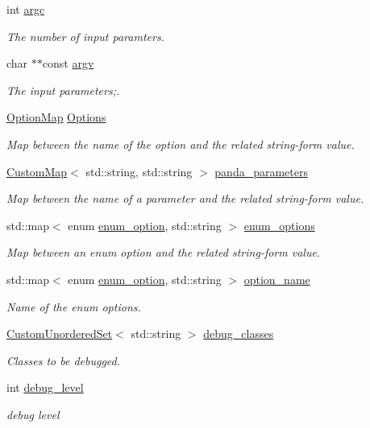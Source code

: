 \begin{DoxyCompactItemize}
\item 
int \hyperlink{classParameter_a76b21c2ed27f73883401229217020814}{argc}
\begin{DoxyCompactList}\small\item\em The number of input paramters. \end{DoxyCompactList}\item 
char $\ast$$\ast$const \hyperlink{classParameter_a538da2e132ca91996baa116097d6238f}{argv}
\begin{DoxyCompactList}\small\item\em The input parameters;. \end{DoxyCompactList}\item 
\hyperlink{classOptionMap}{Option\+Map} \hyperlink{classParameter_ab39f7eae462485611a98baa3070cab82}{Options}
\begin{DoxyCompactList}\small\item\em Map between the name of the option and the related string-\/form value. \end{DoxyCompactList}\item 
\hyperlink{custom__map_8hpp_a18ca01763abbe3e5623223bfe5aaac6b}{Custom\+Map}$<$ std\+::string, std\+::string $>$ \hyperlink{classParameter_a188d59f2efe50b1de6513a908c01d999}{panda\+\_\+parameters}
\begin{DoxyCompactList}\small\item\em Map between the name of a parameter and the related string-\/form value. \end{DoxyCompactList}\item 
std\+::map$<$ enum \hyperlink{Parameter_8hpp_a6d9441db52e537f5588658b218875976}{enum\+\_\+option}, std\+::string $>$ \hyperlink{classParameter_a71adfef6cc51f69c6fb852a5f017fe0f}{enum\+\_\+options}
\begin{DoxyCompactList}\small\item\em Map between an enum option and the related string-\/form value. \end{DoxyCompactList}\item 
std\+::map$<$ enum \hyperlink{Parameter_8hpp_a6d9441db52e537f5588658b218875976}{enum\+\_\+option}, std\+::string $>$ \hyperlink{classParameter_a39687926ae0985dc907fe5079f04be10}{option\+\_\+name}
\begin{DoxyCompactList}\small\item\em Name of the enum options. \end{DoxyCompactList}\item 
\hyperlink{classCustomUnorderedSet}{Custom\+Unordered\+Set}$<$ std\+::string $>$ \hyperlink{classParameter_aea8911a644a863588dfeb64f74619937}{debug\+\_\+classes}
\begin{DoxyCompactList}\small\item\em Classes to be debugged. \end{DoxyCompactList}\item 
int \hyperlink{classParameter_a03af0919e121aef0fa02cd11de566a80}{debug\+\_\+level}
\begin{DoxyCompactList}\small\item\em debug level \end{DoxyCompactList}\end{DoxyCompactItemize}
